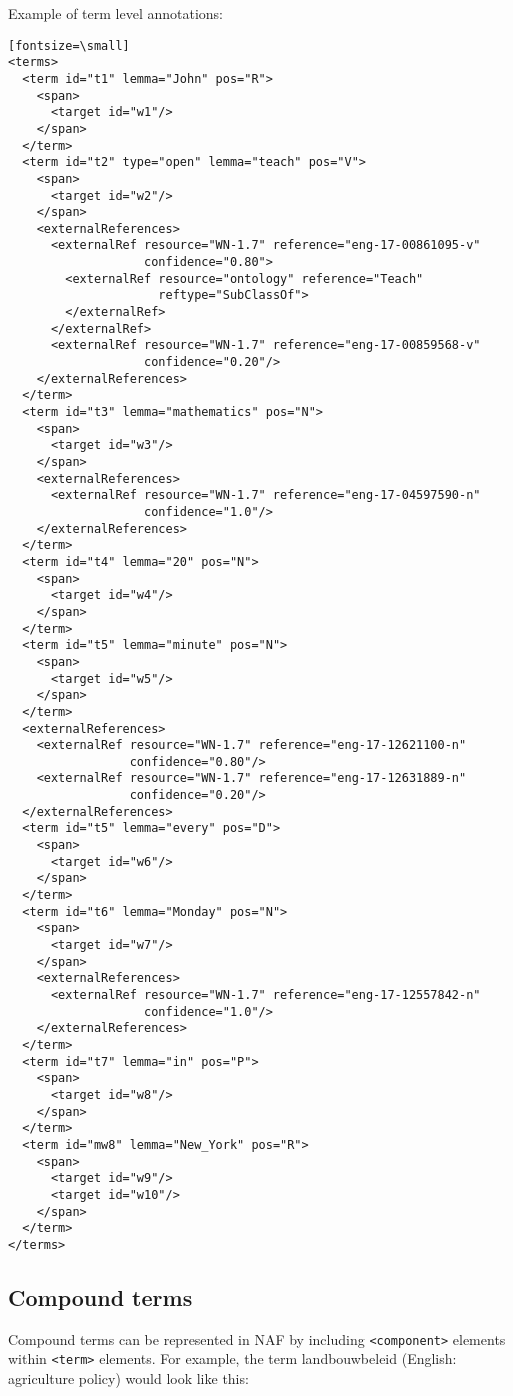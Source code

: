 Example of term level annotations:
\begin{verbatim}[fontsize=\small]
<terms>
  <term id="t1" lemma="John" pos="R">
    <span>
      <target id="w1"/>
    </span>
  </term>
  <term id="t2" type="open" lemma="teach" pos="V">
    <span>
      <target id="w2"/>
    </span>
    <externalReferences>
      <externalRef resource="WN-1.7" reference="eng-17-00861095-v"
                   confidence="0.80">
        <externalRef resource="ontology" reference="Teach"
                     reftype="SubClassOf">
        </externalRef>
      </externalRef>
      <externalRef resource="WN-1.7" reference="eng-17-00859568-v"
                   confidence="0.20"/>
    </externalReferences>
  </term>
  <term id="t3" lemma="mathematics" pos="N">
    <span>
      <target id="w3"/>
    </span>
    <externalReferences>
      <externalRef resource="WN-1.7" reference="eng-17-04597590-n"
                   confidence="1.0"/>
    </externalReferences>
  </term>
  <term id="t4" lemma="20" pos="N">
    <span>
      <target id="w4"/>
    </span>
  </term>
  <term id="t5" lemma="minute" pos="N">
    <span>
      <target id="w5"/>
    </span>
  </term>
  <externalReferences>
    <externalRef resource="WN-1.7" reference="eng-17-12621100-n"
                 confidence="0.80"/>
    <externalRef resource="WN-1.7" reference="eng-17-12631889-n"
                 confidence="0.20"/>
  </externalReferences>
  <term id="t5" lemma="every" pos="D">
    <span>
      <target id="w6"/>
    </span>
  </term>
  <term id="t6" lemma="Monday" pos="N">
    <span>
      <target id="w7"/>
    </span>
    <externalReferences>
      <externalRef resource="WN-1.7" reference="eng-17-12557842-n"
                   confidence="1.0"/>
    </externalReferences>
  </term>
  <term id="t7" lemma="in" pos="P">
    <span>
      <target id="w8"/>
    </span>
  </term>
  <term id="mw8" lemma="New_York" pos="R">
    <span>
      <target id="w9"/>
      <target id="w10"/>
    </span>
  </term>
</terms>
\end{verbatim}

\subsection{Compound terms}
\label{sec:compound-terms}

Compound terms can be represented in NAF by including \texttt{<component>}
elements within \texttt{<term>} elements. For example, the term
landbouwbeleid (English: agriculture policy) would look like this:

